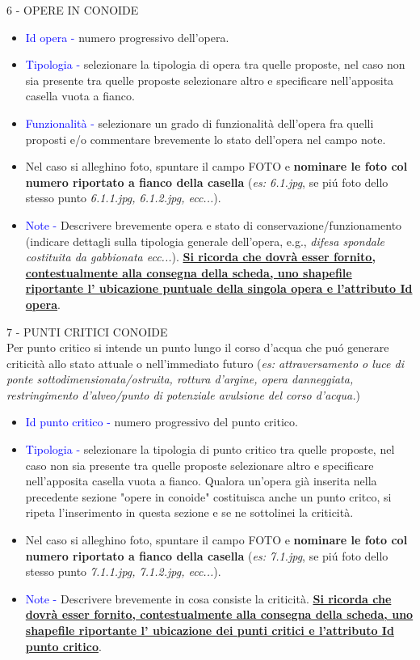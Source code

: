 \documentclass[12pt,a4paper]{article}
\begin{document}
\begin{flushleft}
\vskip 5mm
6 - OPERE IN CONOIDE\\
\begin{itemize}
\item{\textcolor{blue}{Id opera - }} numero progressivo dell'opera.
\item{\textcolor{blue}{Tipologia - }} selezionare la tipologia di opera tra quelle proposte, nel caso non sia presente tra quelle proposte selezionare altro e specificare nell'apposita casella vuota a fianco. 
\item{\textcolor{blue}{Funzionalità - }} selezionare un grado di funzionalità dell'opera fra quelli proposti e/o commentare brevemente lo stato dell'opera nel campo note.
\item{\textcolor{blue}{}} Nel caso si alleghino foto, spuntare il campo FOTO e \textbf{nominare le foto col numero riportato a fianco della casella} (\textit{es: 6.1.jpg}, se pi\'u foto dello stesso punto \textit{6.1.1.jpg, 6.1.2.jpg, ecc...}).
\item{\textcolor{blue}{Note - }} Descrivere brevemente opera e stato di conservazione/funzionamento (indicare dettagli sulla tipologia generale dell'opera, e.g., \textit{difesa spondale costituita da gabbionata ecc...}).\vskip 5mm
\textbf{\uline{Si ricorda che dovrà esser fornito, contestualmente alla consegna della scheda, uno shapefile riportante l' ubicazione puntuale della singola opera e l'attributo Id opera}}.
\end{itemize}

\vskip 5mm
7 - PUNTI CRITICI CONOIDE\\
Per punto critico si intende un punto lungo il corso d'acqua che pu\'o generare criticità allo stato attuale o nell'immediato  futuro (\textit{es: attraversamento o luce di ponte sottodimensionata/ostruita, rottura d'argine, opera danneggiata, restringimento d'alveo/punto di potenziale avulsione del corso d'acqua.}) 
\begin{itemize}
\item{\textcolor{blue}{Id punto critico - }} numero progressivo del punto critico.
\item{\textcolor{blue}{Tipologia - }} selezionare la tipologia di punto critico tra quelle proposte, nel caso non sia presente tra quelle proposte selezionare altro e specificare nell'apposita casella vuota a fianco. Qualora un'opera già inserita nella precedente sezione "opere in conoide" costituisca anche un punto critco, si ripeta l'inserimento in questa sezione e se ne sottolinei la criticità.
\item{\textcolor{blue}{}} Nel caso si alleghino foto, spuntare il campo FOTO e \textbf{nominare le foto col numero riportato a fianco della casella} (\textit{es: 7.1.jpg}, se pi\'u foto dello stesso punto \textit{7.1.1.jpg, 7.1.2.jpg, ecc...}).
\item{\textcolor{blue}{Note - }} Descrivere brevemente in cosa consiste la criticità.\vskip 5mm
\textbf{\uline{Si ricorda che dovrà esser fornito, contestualmente alla consegna della scheda, uno shapefile riportante l' ubicazione dei punti critici e l'attributo Id punto critico}}.
\end{itemize}



\end{flushleft}
\end{document}
